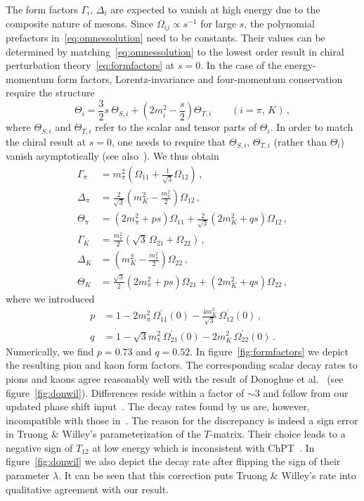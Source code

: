 \documentclass[preprintnumbers,twocolumn,aps,floats,nofootinbib]{revtex4-1}
\begin{document}
The form factors $\Gamma_i,\,\Delta_i$ are expected to vanish at high energy due to the composite nature of mesons. Since $\Omega_{ij}\propto s^{-1}$ for large $s$, the polynomial prefactors in~\eqref{eq:omnessolution} need to be constants. Their values can be determined by matching~\eqref{eq:omnessolution} to the lowest order result in chiral perturbation theory~\eqref{eq:formfactors} at $s=0$. In the case of the energy-momentum form factors, Lorentz-invariance and four-momentum conservation require the structure~\cite{Donoghue:1991qv}
\begin{equation}
 \Theta_i = \frac{3}{2} s\: \Theta_{S,i} + \left(2m_i^2-\frac{s}{2}\right) \Theta_{T,i}\qquad (i=\pi,\,K)\,,
\end{equation}
where $\Theta_{S,i}$ and $\Theta_{T,i}$ refer to the scalar and tensor parts of $\Theta_i$. In order to match the chiral result at $s=0$, one needs to require that $\Theta_{S,i},\,\Theta_{T,i}$ (rather than $\Theta_i$) vanish asymptotically (see also~\cite{Donoghue:1990xh}). We thus obtain
\begin{align}
 \Gamma_\pi&= m_\pi^2\left(\Omega_{11} + \frac{1}{\sqrt{3}} \Omega_{12}\right)\,,\nonumber\\
 \Delta_\pi&= \frac{2}{\sqrt{3}}\left(m_K^2-\frac{m_\pi^2}{2}\right)\Omega_{12}\,,\nonumber\\
 \Theta_\pi&= \left(2 m_\pi^2 + p s\right)\Omega_{11} +  \frac{2}{\sqrt{3}}\left(2m_K^2 + q s\right)\Omega_{12}\,,\nonumber\\ 
  \Gamma_K&= \frac{m_\pi^2}{2}\left(\sqrt{3}\,\Omega_{21} + \Omega_{22}\right)\nonumber\,,\nonumber\\
 \Delta_K&= \left(m_K^2-\frac{m_\pi^2}{2}\right)\Omega_{22}\,,\nonumber\\
  \Theta_K&= \frac{\sqrt{3}}{2}\left(2 m_\pi^2 + p s\right)\Omega_{21} +  \left(2m_K^2 + q s\right)\Omega_{22}\,,
\end{align}
where we introduced
\begin{align}
 p&=1-2 m_\pi^2\,\Omega_{11}^\prime(0)-\frac{4 m_K^2}{\sqrt{3}}\,\Omega_{12}^\prime(0)\,,\nonumber\\
 q&=1-\sqrt{3} m_\pi^2\, \Omega_{21}^\prime(0)-2 m_K^2\,\Omega_{22}^\prime(0)\,.
\end{align}
Numerically, we find $p=0.73$ and $q=0.52$. In figure~\ref{fig:formfactors} we depict the resulting pion and kaon form factors. The corresponding scalar decay rates to pions and kaons agree reasonably well with the result of Donoghue et al.~\cite{Donoghue:1990xh} (see figure~\ref{fig:donwil}). Differences reside within a factor of $\sim 3$ and follow from our updated phase shift input~\cite{Hoferichter:2012wf}. The decay rates found by us are, however, incompatible with those in~\cite{Truong:1989my}. The reason for the discrepancy is indeed a sign error in Truong \& Willey's parameterization of the $T$-matrix. Their choice leads to a negative sign of $T_{12}$ at low energy which is inconsistent with ChPT~\cite{Donoghue:1990xh}. In figure~\ref{fig:donwil} we also depict the decay rate after flipping the sign of their parameter $\lambda$. It can be seen that this correction puts Truong \& Willey's rate into qualitative agreement with our result. 
\end{document}
